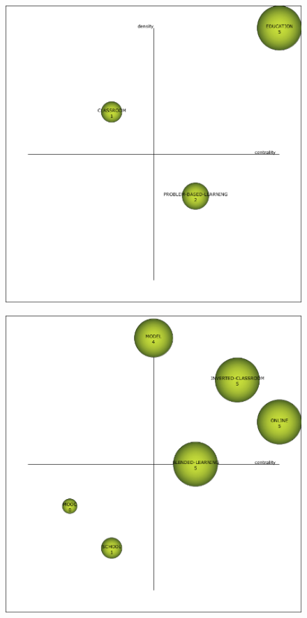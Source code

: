\documentclass{textolivre-html}
\begin{document}
\begin{figure}[htbp]
 \begin{minipage}{.45\textwidth}
 \includegraphics[width=\textwidth]{Fig03a.png}
 \label{fig03a}
 \end{minipage}
 \hfill
 \begin{minipage}{.45\textwidth}
 \includegraphics[width=\textwidth]{Fig03b.png}

\end{minipage}
\end{figure}
\end{document}
